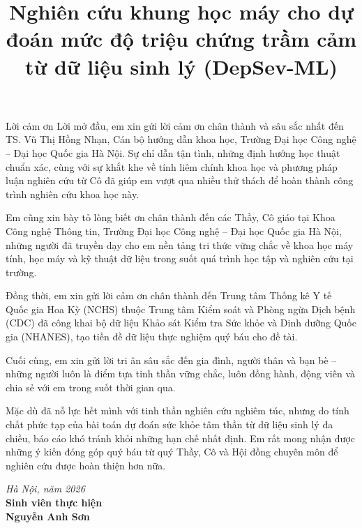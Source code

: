 \documentclass{uetgraduation}
\begin{document}
\title{Nghiên cứu khung học máy cho dự đoán mức độ triệu chứng trầm cảm từ dữ liệu sinh lý (DepSev-ML)}

\makecovers

\pagestyle{plain}

\begin{preamble}{Lời cảm ơn}
Lời mở đầu, em xin gửi lời cảm ơn chân thành và sâu sắc nhất đến TS. Vũ Thị Hồng Nhạn, Cán bộ hướng dẫn khoa học, Trường Đại học Công nghệ -- Đại học Quốc gia Hà Nội. Sự chỉ dẫn tận tình, những định hướng học thuật chuẩn xác, cùng với sự khắt khe về tính liêm chính khoa học và phương pháp luận nghiên cứu từ Cô đã giúp em vượt qua nhiều thử thách để hoàn thành công trình nghiên cứu khoa học này.

Em cũng xin bày tỏ lòng biết ơn chân thành đến các Thầy, Cô giáo tại Khoa Công nghệ Thông tin, Trường Đại học Công nghệ -- Đại học Quốc gia Hà Nội, những người đã truyền dạy cho em nền tảng tri thức vững chắc về khoa học máy tính, học máy và kỹ thuật dữ liệu trong suốt quá trình học tập và nghiên cứu tại trường.

Đồng thời, em xin gửi lời cảm ơn chân thành đến Trung tâm Thống kê Y tế Quốc gia Hoa Kỳ (NCHS) thuộc Trung tâm Kiểm soát và Phòng ngừa Dịch bệnh (CDC) đã công khai bộ dữ liệu Khảo sát Kiểm tra Sức khỏe và Dinh dưỡng Quốc gia (NHANES), tạo tiền đề dữ liệu thực nghiệm quý báu cho đề tài.

Cuối cùng, em xin gửi lời tri ân sâu sắc đến gia đình, người thân và bạn bè -- những người luôn là điểm tựa tinh thần vững chắc, luôn đồng hành, động viên và chia sẻ với em trong suốt thời gian qua.

Mặc dù đã nỗ lực hết mình với tinh thần nghiên cứu nghiêm túc, nhưng do tính chất phức tạp của bài toán dự đoán sức khỏe tâm thần từ dữ liệu sinh lý đa chiều, báo cáo khó tránh khỏi những hạn chế nhất định. Em rất mong nhận được những ý kiến đóng góp quý báu từ quý Thầy, Cô và Hội đồng chuyên môn để nghiên cứu được hoàn thiện hơn nữa.

\vspace{1.5cm}
\begin{flushright}
\textit{Hà Nội, năm 2026}\\[0.2cm]
\textbf{Sinh viên thực hiện}\\[1.5cm]
\textbf{Nguyễn Anh Sơn}
\end{flushright}
\end{preamble}
\end{document}
